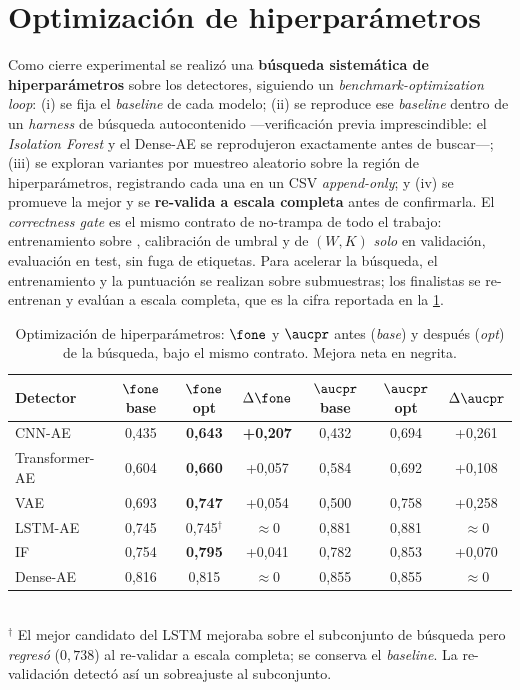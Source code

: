 \section{Optimización de hiperparámetros}
\label{sec:resultados-optimizacion}

Como cierre experimental se realizó una \textbf{búsqueda sistemática de
hiperparámetros} sobre los detectores, siguiendo un \emph{benchmark-optimization
loop}: (i) se fija el \emph{baseline} de cada modelo; (ii) se reproduce ese
\emph{baseline} dentro de un \emph{harness} de búsqueda autocontenido
---verificación previa imprescindible: el \emph{Isolation Forest} y el Dense-AE
se reprodujeron exactamente antes de buscar---; (iii) se exploran variantes por
muestreo aleatorio sobre la región de hiperparámetros, registrando cada una en un
CSV \emph{append-only}; y (iv) se promueve la mejor y se \textbf{re-valida a
escala completa} antes de confirmarla. El \emph{correctness gate} es el mismo
contrato de no-trampa de todo el trabajo: entrenamiento sobre ,
calibración de umbral y de $(W,K)$ \emph{solo} en validación, evaluación en test,
sin fuga de etiquetas. Para acelerar la búsqueda, el entrenamiento y la
puntuación se realizan sobre submuestras; los finalistas se re-entrenan y evalúan
a escala completa, que es la cifra reportada en la \cref{tab:optim}.

\begin{table}[H]
\centering
\caption{Optimización de hiperparámetros: $\fone$ y $\aucpr$ antes (\emph{base})
y después (\emph{opt}) de la búsqueda, bajo el mismo contrato. Mejora neta en
negrita.}
\label{tab:optim}
\footnotesize
\begin{tabular}{lcccccc}
\toprule
Detector & $\fone$ base & $\fone$ opt & $\Delta\fone$ & $\aucpr$ base & $\aucpr$ opt & $\Delta\aucpr$ \\
\midrule
CNN-AE         & 0{,}435 & \textbf{0{,}643} & \textbf{+0{,}207} & 0{,}432 & 0{,}694 & +0{,}261 \\
Transformer-AE & 0{,}604 & \textbf{0{,}660} & +0{,}057 & 0{,}584 & 0{,}692 & +0{,}108 \\
VAE            & 0{,}693 & \textbf{0{,}747} & +0{,}054 & 0{,}500 & 0{,}758 & +0{,}258 \\
LSTM-AE        & 0{,}745 & 0{,}745$^{\dagger}$ & $\approx$0 & 0{,}881 & 0{,}881 & $\approx$0 \\
IF             & 0{,}754 & \textbf{0{,}795} & +0{,}041 & 0{,}782 & 0{,}853 & +0{,}070 \\
Dense-AE       & 0{,}816 & 0{,}815 & $\approx$0 & 0{,}855 & 0{,}855 & $\approx$0 \\
\bottomrule
\end{tabular}
\\[2pt]
{\footnotesize $^{\dagger}$ El mejor candidato del LSTM mejoraba sobre el subconjunto de búsqueda pero \emph{regresó} ($0{,}738$) al re-validar a escala completa; se conserva el \emph{baseline}. La re-validación detectó así un sobreajuste al subconjunto.}
\end{table}

